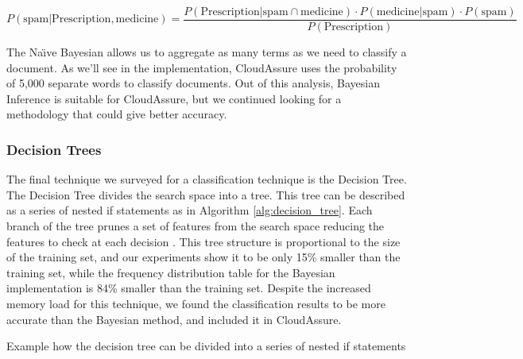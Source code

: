 \begin{equation}
    P(\text{spam} | \text{Prescription}, \text{medicine})
    = \frac{P(\text{Prescription}
    | \text{spam} \cap \text{medicine} ) \cdot P(\text{medicine}
    | \text{spam}) \cdot P(\text{spam})}{P(\text{Prescription})}
    \label{eq:BayesSpamMedicine}
\end{equation}

The Na\"{\i}ve Bayesian allows us to aggregate as many terms as we need to classify
a document. As we'll see in the implementation, CloudAssure uses the probability of 5,000
separate words to classify documents. Out of this analysis,  Bayesian
Inference is
suitable for CloudAssure, but we continued looking for a methodology that could
give better accuracy.
\subsubsection{Decision Trees}
The final technique we surveyed for a classification technique is the Decision
Tree. The Decision Tree divides the search space into a tree. This tree can be
described as a series of nested if statements as in
Algorithm \ref{alg:decision_tree}. Each branch of the
tree prunes a set of features from the search space reducing the features to
check at each decision \autocite{Segaran2008}. This tree structure is
proportional to the size of the training set, and our experiments show it to be
only 15\% smaller than the training set, while the frequency distribution table
for the Bayesian implementation is 84\% smaller than the training set. Despite
the increased memory load for this technique, we found the classification
results to be more accurate than the Bayesian method, and included it in
CloudAssure.

\begin{algorithm}
    \caption{Example how the decision tree can be divided into a series of
    nested if statements}
    \label{alg:decision_tree}
\begin{algorithmic}
                \EndIf
                \EndIf
                        \EndIf
                        \EndIf
                                \EndIf
                            \EndIf
                        \EndIf
                    \EndIf
                \EndIf
            \EndIf
        \EndIf
\end{algorithmic}
\end{algorithm}

